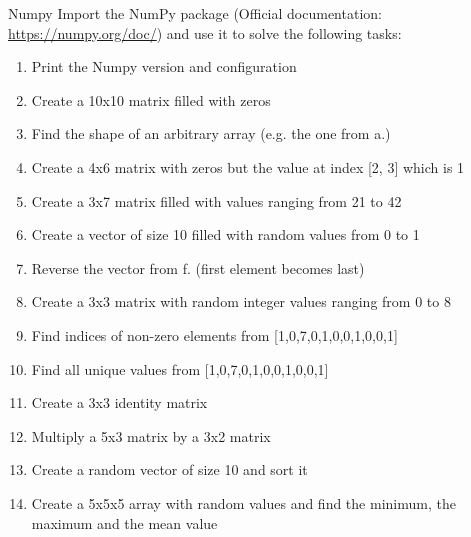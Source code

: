 \documentclass[twoside]{article}
\begin{document}
\maketitle

\begin{task}{Numpy}{}{}
Import the NumPy package (Official documentation: \href{https://numpy.org/doc/}{https://numpy.org/doc/}) and use it to solve the following tasks:

\begin{enumerate}
    \item Print the Numpy version and configuration
    \item Create a 10x10 matrix filled with zeros
    \item Find the shape of an arbitrary array (e.g. the one from a.)
    \item Create a 4x6 matrix with zeros but the value at index [2, 3] which is 1
    \item Create a 3x7 matrix filled with values ranging from 21 to 42
    \item Create a vector of size 10 filled with random values from 0 to 1
    \item Reverse the vector from f. (first element becomes last)
    \item Create a 3x3 matrix with random integer values ranging from 0 to 8
    \item Find indices of non-zero elements from [1,0,7,0,1,0,0,1,0,0,1]
    \item Find all unique values from [1,0,7,0,1,0,0,1,0,0,1]
    \item Create a 3x3 identity matrix
    \item Multiply a 5x3 matrix by a 3x2 matrix
    \item Create a random vector of size 10 and sort it
    \item Create a 5x5x5 array with random values and find the minimum, the maximum and the mean value
\end{enumerate}
\end{task}
\end{document}
